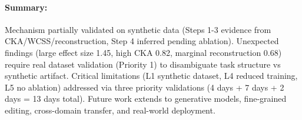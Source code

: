 \paragraph{Summary:} Mechanism partially validated on synthetic data (Steps 1-3 evidence from CKA/WCSS/reconstruction, Step 4 inferred pending ablation). Unexpected findings (large effect size 1.45, high CKA 0.82, marginal reconstruction 0.68) require real dataset validation (Priority 1) to disambiguate task structure vs synthetic artifact. Critical limitations (L1 synthetic dataset, L4 reduced training, L5 no ablation) addressed via three priority validations (4 days + 7 days + 2 days = 13 days total). Future work extends to generative models, fine-grained editing, cross-domain transfer, and real-world deployment.
